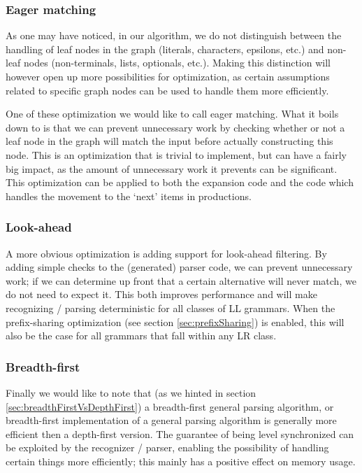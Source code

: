 \documentclass[a4paper,10pt]{article}
\begin{document}
\subsubsection{Eager matching}
As one may have noticed, in our algorithm, we do not distinguish between the handling of leaf nodes in the graph (literals, characters, epsilons, etc.) and non-leaf nodes (non-terminals, lists, optionals, etc.). Making this distinction will however open up more possibilities for optimization, as certain assumptions related to specific graph nodes can be used to handle them more efficiently.

One of these optimization we would like to call eager matching. What it boils down to is that we can prevent unnecessary work by checking whether or not a leaf node in the graph will match the input before actually constructing this node. This is an optimization that is trivial to implement, but can have a fairly big impact, as the amount of unnecessary work it prevents can be significant. This optimization can be applied to both the expansion code and the code which handles the movement to the `next' items in productions.

\subsubsection{Look-ahead}
A more obvious optimization is adding support for look-ahead filtering. By adding simple checks to the (generated) parser code, we can prevent unnecessary work; if we can determine up front that a certain alternative will never match, we do not need to expect it. This both improves performance and will make recognizing / parsing deterministic for all classes of LL grammars. When the prefix-sharing optimization (see section \ref{sec:prefixSharing}) is enabled, this will also be the case for all grammars that fall within any LR class.

\subsubsection{Breadth-first}
Finally we would like to note that (as we hinted in section \ref{sec:breadthFirstVsDepthFirst}) a breadth-first general parsing algorithm, or breadth-first implementation of a general parsing algorithm is generally more efficient then a depth-first version. The guarantee of being level synchronized can be exploited by the recognizer / parser, enabling the possibility of handling certain things more efficiently; this mainly has a positive effect on memory usage.
\end{document}
